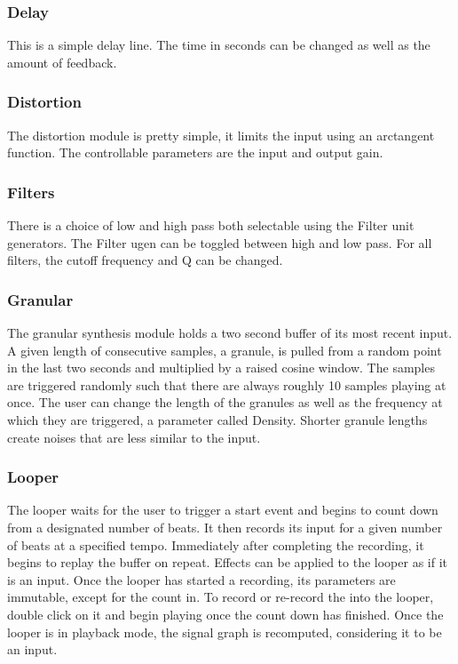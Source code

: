 \documentclass[pdftext,twoside,10pt]{article}
\begin{document}
\subsubsection*{Delay}
This is a simple delay line. The time in seconds can be changed as well as the amount of feedback.

\subsubsection*{Distortion}
The distortion module is pretty simple, it limits the input using an arctangent function. The controllable parameters are the input and output gain.

\subsubsection*{Filters}
There is a choice of low and high pass both selectable using the Filter unit generators. The Filter ugen can be toggled between high and low pass. For all filters, the cutoff frequency and Q can be changed.

\subsubsection*{Granular}
The granular synthesis module holds a two second buffer of its most recent input. A given length of consecutive samples, a granule, is pulled from a random point in the last two seconds and multiplied by a raised cosine window. The samples are triggered randomly such that there are always roughly 10 samples playing at once. The user can change the length of the granules as well as the frequency at which they are triggered, a parameter called Density. Shorter granule lengths create noises that are less similar to the input.

\subsubsection*{Looper}
The looper waits for the user to trigger a start event and begins to count down from a designated number of beats. It then records its input for a given number of beats at a specified tempo. Immediately after completing the recording, it begins to replay the buffer on repeat. Effects can be applied to the looper as if it is an input. Once the looper has started a recording, its parameters are immutable, except for the count in. To record or re-record the into the looper, double click on it and begin playing once the count down has finished. Once the looper is in playback mode, the signal graph is recomputed, considering it to be an input.
\end{document}
